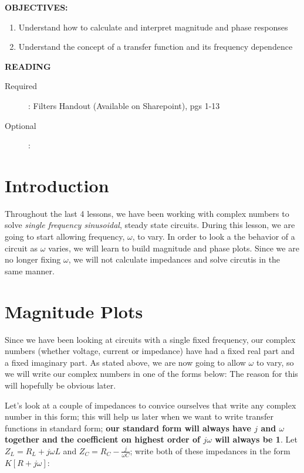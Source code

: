\documentclass{handout}
\begin{document}
\maketitle

\textbf{OBJECTIVES:}
\begin{enumerate}
\item Understand how to calculate and interpret magnitude and phase responses
\item Understand the concept of a transfer function and its frequency dependence
\end{enumerate}

\textbf{READING}
\begin{description}
\item [Required]:
Filters Handout (Available on Sharepoint), pgs 1-13
\item [Optional]:
\end{description}

\section{Introduction}
Throughout the last 4 lessons, we have been working with complex numbers to solve {\em single frequency sinusoidal}, steady state circuits.  During this lesson, we are going to start allowing frequency, $\omega$, to vary.  In order to look a the behavior of a circuit as $\omega$ varies, we will learn to build magnitude and phase plots.  Since we are no longer fixing $\omega$, we will not calculate impedances and solve circutis in the same manner.

\section{Magnitude Plots}
Since we have been looking at circuits with a single fixed frequency, our complex numbers (whether voltage, current or impedance) have had a fixed real part and a fixed imaginary part. As stated above, we are now going to allow $\omega$ to vary, so we will write our complex numbers in one of the forms below:
 The reason for this will hopefully be obvious later.

 Let's look at a couple of impedances to convice ourselves that write any complex number in this form; this will help us later when we want to write transfer functions in standard form; \textbf{our standard form will always have $j$ and $\omega$ together and the coefficient on highest order of $j\omega$ will always be 1}.  Let $Z_L = R_L+j\omega L$ and $Z_C = R_C-\frac{j}{\omega C}$; write both of these impedances in the form $K[R+j\omega]$:
\end{document}
